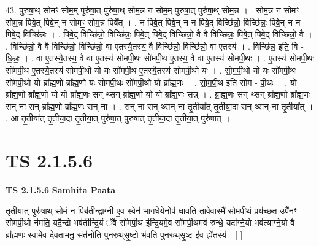 \documentclass[17pt]{extarticle}
\begin{document}
43. पुरु॑षा॒थ् सोमꣳ॒॒ सोम॒म् पुरु॑षा॒त् पुरु॑षा॒थ् सोम॒न्न न सोम॒म् पुरु॑षा॒त् पुरु॑षा॒थ् सोम॒न्न । . सोम॒न्न न सोमꣳ॒॒ सोम॒न्न पिबे॒त् पिबे॒न् न सोमꣳ॒॒ सोम॒न्न पिबे᳚त् । . न पिबे॒त् पिबे॒न् न न पिबे॒द् विच्छि॑न्नो॒ विच्छि॑न्नः॒ पिबे॒न् न न पिबे॒द् विच्छि॑न्नः । . पिबे॒द् विच्छि॑न्नो॒ विच्छि॑न्नः॒ पिबे॒त् पिबे॒द् विच्छि॑न्नो॒ वै वै विच्छि॑न्नः॒ पिबे॒त् पिबे॒द् विच्छि॑न्नो॒ वै । . विच्छि॑न्नो॒ वै वै विच्छि॑न्नो॒ विच्छि॑न्नो॒ वा ए॒तस्यै॒तस्य॒ वै विच्छि॑न्नो॒ विच्छि॑न्नो॒ वा ए॒तस्य॑ । . विच्छि॑न्न॒ इति॒ वि - छि॒न्नः॒ । . वा ए॒तस्यै॒तस्य॒ वै वा ए॒तस्य॑ सोमपी॒थः सो॑मपी॒थ ए॒तस्य॒ वै वा ए॒तस्य॑ सोमपी॒थः । . ए॒तस्य॑ सोमपी॒थः सो॑मपी॒थ ए॒तस्यै॒तस्य॑ सोमपी॒थो यो यः सो॑मपी॒थ ए॒तस्यै॒तस्य॑ सोमपी॒थो यः । . सो॒म॒पी॒थो यो यः सो॑मपी॒थः सो॑मपी॒थो यो ब्रा᳚ह्म॒णो ब्रा᳚ह्म॒णो यः सो॑मपी॒थः सो॑मपी॒थो यो ब्रा᳚ह्म॒णः । . सो॒म॒पी॒थ इति॑ सोम - पी॒थः । . यो ब्रा᳚ह्म॒णो ब्रा᳚ह्म॒णो यो यो ब्रा᳚ह्म॒णः सन् थ्सन् ब्रा᳚ह्म॒णो यो यो ब्रा᳚ह्म॒णः सन्न् । . ब्रा॒ह्म॒णः सन् थ्सन् ब्रा᳚ह्म॒णो ब्रा᳚ह्म॒णः सन् ना सन् ब्रा᳚ह्म॒णो ब्रा᳚ह्म॒णः सन् ना । . सन् ना सन् थ्सन् ना तृ॒तीया᳚त् तृ॒तीया॒दा सन् थ्सन् ना तृ॒तीया᳚त् । . आ तृ॒तीया᳚त् तृ॒तीया॒दा तृ॒तीया॒त् पुरु॑षा॒त् पुरु॑षात् तृ॒तीया॒दा तृ॒तीया॒त् पुरु॑षात् । \newline
\pagebreak
{}
\section*{ TS 2.1.5.6 }

\textbf{TS 2.1.5.6 } \newline
\textbf{Samhita Paata} \newline

तृ॒तीया॒त् पुरु॑षा॒थ् सोमं॒ न पिब॑तीन्द्रा॒ग्नी ए॒व स्वेन॑ भाग॒धेये॒नोप॑ धावति॒ तावे॒वास्मै॑ सोमपी॒थं प्रय॑च्छत॒ उपै॑नꣳ सोमपी॒थो न॑मति॒ यदै॒न्द्रो भव॑तीन्द्रि॒यं ॅवै सो॑मपी॒थ इ॑न्द्रि॒यमे॒व सो॑मपी॒थमव॑ रुन्धे॒ यदा᳚ग्ने॒यो भव॑त्याग्ने॒यो वै ब्रा᳚ह्म॒णः स्वामे॒व दे॒वता॒मनु॒ संत॑नोति पुनरुथ्‌सृ॒ष्टो भ॑वति पुनरुथ्‌सृ॒ष्ट इ॑व॒ ह्ये॑तस्य॑ - [  ] \newline
\end{document}
